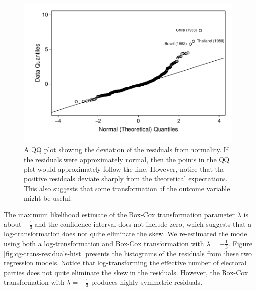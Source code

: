 \documentclass[12pt]{article}
\begin{document}
\begin{figure}[h!]
\begin{center}
	\includegraphics[scale = 0.6]{figs/cg-qq-plot.pdf}
\caption{A QQ plot showing the deviation of the residuals from normality. 
If the residuals were approximately normal, then the points in the QQ plot would approximately follow the line. 
However, notice that the positive residuals deviate sharply from the theoretical expectations. 
This also suggests that some transformation of the outcome variable might be useful.}\label{fig:cg-qq-plot}
\end{center}

\end{figure}

The maximum likelihood estimate of the Box-Cox transformation parameter $\lambda$ is about $-\frac{1}{3}$ and the confidence interval does not include zero, which suggests that a log-transformation does not quite eliminate the skew. 
We re-estimated the model using both a log-transformation and Box-Cox transformation with $\lambda = -\frac{1}{3}$. 
Figure \ref{fig:cg-trans-residuals-hist} presents the histograms of the residuals from these two regression models. 
Notice that log-transforming the effective number of electoral parties does not quite eliminate the skew in the residuals. However, the Box-Cox transformation with $\lambda = -\frac{1}{3}$ produces highly symmetric residuals. 
\end{document}
